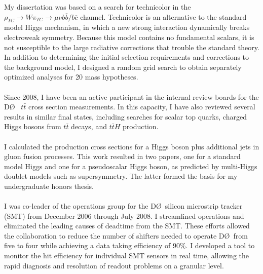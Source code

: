 \documentclass[amsmath,amssymb]{revtex4}
\def\dzero{D\O}
\begin{document}
My dissertation was based on a search for technicolor in the
$\rho_{TC} \to W \pi_{TC} \to \mu\nu b{\overline b}/ b{\overline c}$
channel.  Technicolor is an alternative to the standard model Higgs
mechanism, in which a new strong interaction dynamically breaks
electroweak symmetry.  Because this model contains no fundamental
scalars, it is not susceptible to the large radiative corrections that
trouble the standard theory.  In addition to determining the initial
selection requirements and corrections to the background model, I
designed a random grid search
to obtain separately optimized analyses for 20 mass hypotheses.\\

\\
\indent Since 2008, I have been an active participant in the internal
review boards for the \dzero~ $t{\bar t}$ cross section measurements.
In this capacity, I have also reviewed several results in similar
final states, including searches for scalar top quarks,
charged Higgs bosons from $t{\bar t}$ decays, and $t{\bar t}H$ production.\\

\\
\indent I calculated the production cross sections for a Higgs boson
plus additional jets in gluon fusion processes.  This work resulted in
two papers, one for a standard model Higgs and one for a pseudoscalar
Higgs boson, as predicted by multi-Higgs doublet models such as
supersymmetry.  The latter formed the basis for my undergraduate honors
thesis. \\

\noindent{\bf Tracking System Operations at \dzero} \\
\indent I was co-leader of the operations group for the \dzero~silicon
microstrip tracker (SMT) from December 2006 through July 2008.  I streamlined
operations and eliminated the leading causes of deadtime from the SMT.
These efforts allowed the collaboration to reduce the number of shifters
needed to operate \dzero~from five to four while achieving a data taking
efficiency of 90\%.  I developed a tool to monitor the hit efficiency
for individual SMT sensors in real time, allowing the rapid diagnosis and
resolution of readout problems on a granular level.  
\end{document}
